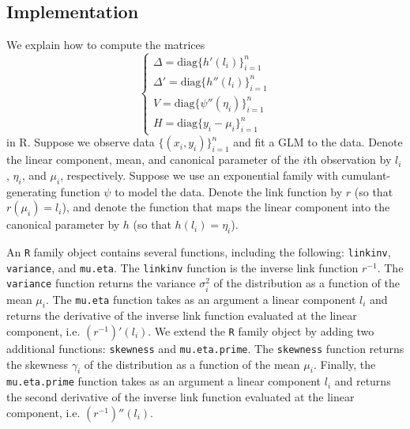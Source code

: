 \documentclass[12pt]{article}
\begin{document}
\subsection{Implementation}

We explain how to compute the matrices 
$$\begin{cases} \Delta = \textrm{diag}\{ h'(l_i) \}_{i=1}^n \\ \Delta' = \textrm{diag}\{ h''(l_i) \}_{i=1}^n \\ V = \textrm{diag} \{ \psi''(\eta_i) \}_{i=1}^n\\ H = \textrm{diag} \{y_i -\mu_i\}_{i=1}^n\end{cases}$$  in R.
Suppose we observe data $\{ (x_i, y_i) \}_{i=1}^n$ and fit a GLM to the data. Denote the linear component, mean, and canonical parameter of the $i$th observation by $l_i$, $\eta_i$, and $\mu_i$, respectively. Suppose we use an exponential family with cumulant-generating function $\psi$ to model the data. Denote the link function by $r$ (so that $r(\mu_i) = l_i$), and denote the function that maps the linear component into the canonical parameter by $h$ (so that $h(l_i) = \eta_i$).

An \texttt{R} family object contains several functions, including the following: \texttt{linkinv}, \texttt{variance}, and \texttt{mu.eta}. The \texttt{linkinv} function is the inverse link function $r^{-1}$. The \texttt{variance} function returns the variance $\sigma_i^2$ of the distribution as a function of the mean $\mu_i$. The \texttt{mu.eta} function takes as an argument a linear component $l_i$ and returns the derivative of the inverse link function evaluated at the linear component, i.e. $(r^{-1})'(l_i)$. We extend the \texttt{R} family object by adding two additional functions: \texttt{skewness} and \texttt{mu.eta.prime}. The \texttt{skewness} function returns the skewness $\gamma_i$ of the distribution as a function of the mean $\mu_i$. Finally, the \texttt{mu.eta.prime} function takes as an argument a linear component $l_i$ and returns the second derivative of the inverse link function evaluated at the linear component, i.e. $(r^{-1})''(l_i)$.
\end{document}
